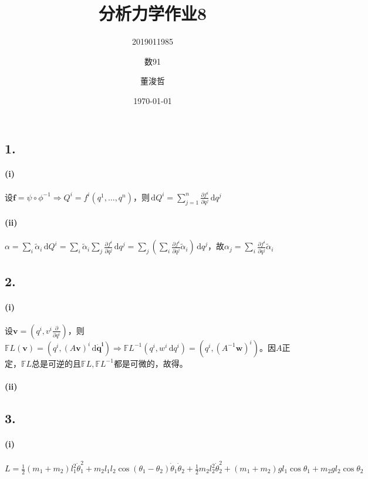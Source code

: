 \documentclass{ctexart}
\title{分析力学作业8}
\author{2019011985\and 数91\and 董浚哲}
\date{\today}
\begin{document}
\maketitle

\subsection*{1.}
\paragraph{(i)}
设$\bm{f}=\psi\circ \phi^{-1}\Rightarrow Q^i=f^i(q^1,\dots, q^n)$，则$\,\mathrm{d} Q^i =\sum\limits_{j=1}^{n} \frac{\partial f^{i}}{\partial q^{j}} \,\mathrm{d} q^j$
\paragraph{(ii)}
$\alpha=\sum\limits_i \tilde{\alpha}_i \,\mathrm{d}Q^i =\sum\limits_i^{} \tilde{\alpha}_i \sum\limits_j^{} \frac{\partial f^{i}}{\partial q^{j}} \,\mathrm{d}q^j=\sum\limits_j^{} \left( \sum\limits_i^{} \frac{\partial f^{i}}{\partial q^{j}}\tilde{\alpha}_i \right) \,\mathrm{d} q^{j}$，故$\alpha_j= \sum\limits_i^{} \frac{\partial f^{i}}{\partial q^{j}}\tilde{\alpha}_{i}$
\subsection*{2.}
\paragraph{(i)}
设$\bm{v}=(q^i, v^i \frac{\partial  }{\partial q^i})$，则$\mathbb{F}L(\bm{v})= (q^i, (A \bm{v})^i \,\mathrm{d} \bm{ \dot{q}^i})\Rightarrow \mathbb{F}L^{-1}(q^i, w^i \,\mathrm{d}q^i)= (q^i, (A^{-1} \bm{w})^i)$。因$A$正定，$\mathbb{F}L$总是可逆的且$\mathbb{F}L, \mathbb{F}L^{-1}$都是可微的，故得。
\paragraph{(ii)}

\subsection*{3.}
\paragraph{(i)}
$L=\frac{1}{2}(m_1+m_2)l_1^2 \dot{\theta}_1^2+m_2l_1l_2 \cos(\theta_1-\theta_2) \dot{\theta}_1 \dot{\theta}_2 +\frac{1}{2}m_2 l_2^2 \dot{\theta}_2^2+(m_1+m_2)gl_1 \cos\theta_1+m_2gl_2\cos\theta_2$
\end{document}
